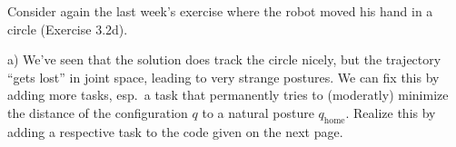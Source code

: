 







Consider again the last week's exercise where the robot moved his hand
in a circle (Exercise 3.2d).

a) We've seen that the solution does track the circle nicely, but the
trajectory ``gets lost'' in joint space, leading to very strange
postures. We can fix this by adding more tasks, esp.\ a task that
permanently tries to (moderatly) minimize the distance of the
configuration $q$ to a natural posture $q_\text{home}$. Realize this
by adding a respective task to the code given on the next page.

